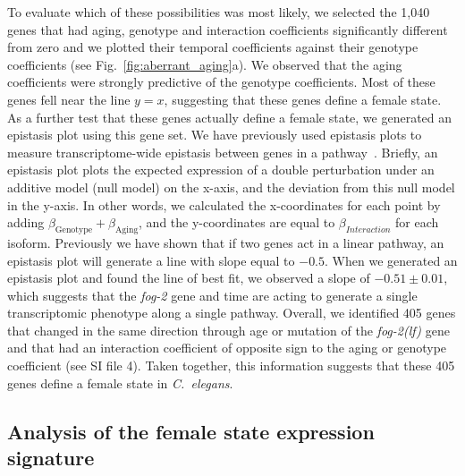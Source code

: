 \documentclass[9pt,twocolumn,twoside]{gsag3jnl}
\newcommand{\cel}{\emph{C.~elegans}}
\newcommand{\fog}{\emph{\mbox{fog-2(lf)}}}
\newcommand{\gene}[1]{\emph{\mbox{#1}}}
\newcommand{\intersectn}{1,040}
\newcommand{\femalen}{405}
\begin{document}
To evaluate which of these possibilities was most likely, we selected
the \intersectn{} genes that had aging, genotype and interaction coefficients
significantly different from zero and we plotted their temporal coefficients
against their genotype coefficients (see Fig.~\ref{fig:aberrant_aging}a). We
observed that the aging coefficients were strongly predictive of the genotype
coefficients. Most of these genes fell near the line $y=x$, suggesting that these
genes define a female state. As a further test that these genes actually define
a female state, we generated an epistasis plot using this gene set. We have
previously used epistasis plots to measure transcriptome-wide epistasis between
genes in a pathway~\citep{}.
Briefly, an epistasis plot plots the expected expression of a double perturbation
under an additive model (null model) on the x-axis, and the deviation from this
null model in the y-axis. In other words, we calculated the x-coordinates for each
point by adding $\beta_\mathrm{Genotype} + \beta_\mathrm{Aging}$, and the
y-coordinates are equal to $\beta_{Interaction}$ for each isoform.
Previously we have shown that if two genes act in a
linear pathway, an epistasis plot will generate a line with slope equal to $-0.5$.
When we generated an epistasis plot and found the line of best fit, we observed
a slope of $-0.51\pm 0.01$, which suggests that the \gene{fog-2} gene and time
are acting to generate a single transcriptomic phenotype along a single pathway.
Overall, we identified
\femalen{} genes that changed in the same direction through age or mutation
of the \fog{} gene and that had an interaction coefficient of opposite sign to
the aging or genotype coefficient (see SI file 4). Taken together, this
information suggests that these \femalen{} genes define a female state in
\cel{}.

\subsection*{Analysis of the female state expression signature}
\end{document}
